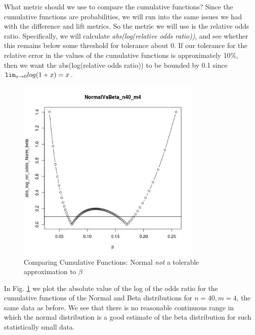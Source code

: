 \documentclass[letterpaper,12pt]{article}
\begin{document}
What metric should we use to compare the cumulative functions?
Since the cumulative functions
are probabilities, we will run into the same issues we had with the
difference and lift metrics.  So the metric we will use is the relative odds
ratio.  Specifically, we will calculate {\it abs(log(relative odds ratio))},
and see whether this
remains below some threshold for tolerance about 0. If our tolerance for the
relative error
in the values of the cumulative functions
is approximately 10\%, then we want the abs(log(relative odds ratio)) to be
bounded by 0.1 since \({\tt lim}_{x\rightarrow 0}log(1+x)=x\).
\begin{figure}[ht!]
\centering
\includegraphics[width=90mm]{NormalVsBeta_n40_m4}
\caption{Comparing Cumulative Functions: Normal {\em not} a tolerable
approximation to \(\beta\) \label{fig:NormalVsBeta_40_4}}
\end{figure}
In Fig. \ref{fig:NormalVsBeta_40_4} we plot the absolute value of the log
of the odds ratio for the cumulative functions of the Normal and Beta
distributions for \(n=40, m=4\), the same data as before. We see that there is
no reasonable continuous range in which the normal distribution is a
good estimate of the beta distribution for such statistically small data.
\end{document}
